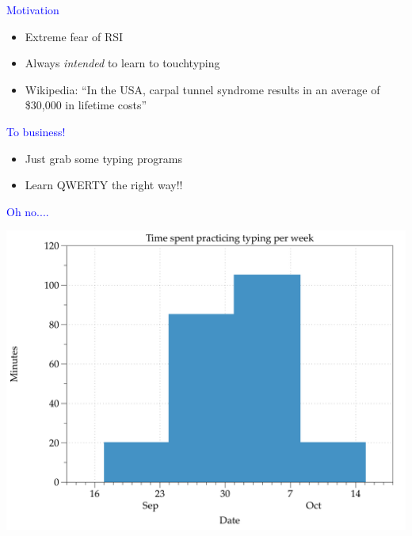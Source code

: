 \documentclass[landscape]{slides}
\begin{document}
\begin{slide}

    \textcolor{blue}{\Large{Motivation}}

    \begin{itemize}
        \item Extreme fear of RSI
        \item Always \emph{intended} to learn to touchtyping
        \item Wikipedia: ``In the USA, carpal tunnel syndrome results in an average of \$30,000 in lifetime costs''
    \end{itemize}

\end{slide}


\begin{slide}

    \textcolor{blue}{\Large{To business!}}

    \begin{itemize}
        \item Just grab some typing programs
        \item Learn QWERTY the right way!!
    \end{itemize}

\end{slide}


\begin{slide}

    \textcolor{blue}{\Large{Oh no....}}

\end{slide}

\begin{slide}
    \includegraphics[width=\textwidth]{first-practice}
\end{slide}
\end{document}
